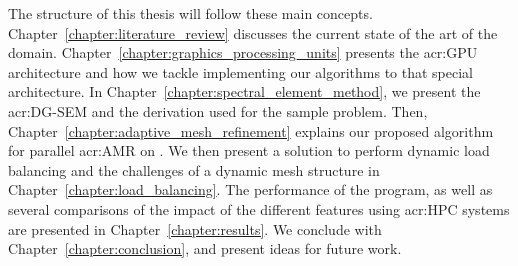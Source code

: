 The structure of this thesis will follow these main concepts.
Chapter~\ref{chapter:literature_review} discusses the current state of the art of the domain.
Chapter~\ref{chapter:graphics_processing_units} presents the \acrshort{acr:GPU} architecture and how
we tackle implementing our algorithms to that special architecture. In
Chapter~\ref{chapter:spectral_element_method}, we present the \acrshort{acr:DG-SEM} and the
derivation used for the sample problem. Then, Chapter~\ref{chapter:adaptive_mesh_refinement}
explains our proposed algorithm for parallel \acrshort{acr:AMR} on . We then
present a solution to perform dynamic load balancing and the challenges of a dynamic mesh structure
in Chapter~\ref{chapter:load_balancing}. The performance of the program, as well as several
comparisons of the impact of the different features using \acrshort{acr:HPC} systems are presented
in Chapter~\ref{chapter:results}. We conclude with Chapter~\ref{chapter:conclusion}, and present
ideas for future work.
